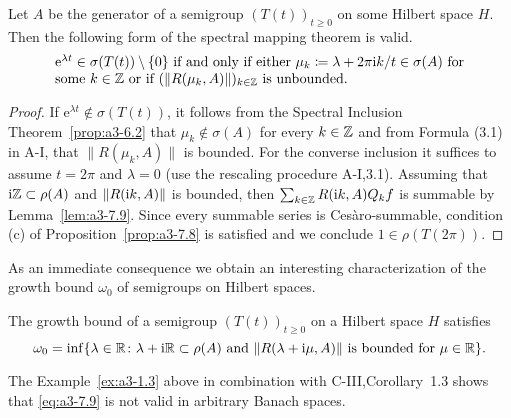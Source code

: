 \begin{theorem}\label{thm:a3-7.10}
%
Let $A$ be the generator of a semigroup $(T(t))_{t\geq 0}$ on some Hilbert space $H$.
Then the following form of the spectral mapping theorem is valid.
\[
\begin{minipage}{.85\textwidth}
	$ \mathrm{e}^{\lambda t} \in \sigma(T(t))\setminus\{0\} $ if and only if either 
	$\mu_{k}\coloneqq \lambda + 2\pi\im  k/t \in \sigma(A)$ for some  $k \in \Z$
	or  if $(\|R(\mu_{k},A)\|)_{k\in\Z}$ is unbounded.
\end{minipage}
\]
\end{theorem}
\begin{proof}
If $\mathrm{e}^{\lambda t} \not\in \sigma(T(t))$, it follows from the Spectral Inclusion Theorem~\ref{prop:a3-6.2} that $\mu_{k} \not\in \sigma(A)$ for every $k \in \mathbb{Z}$ and from Formula (3.1) in A-I, that $\|R(\mu_{k},A)\|$ is bounded.
For the converse inclusion it suffices to assume $t = 2\pi$ and $\lambda = 0$ (use the rescaling procedure A-I,3.1).
Assuming that $\mathrm{i}\mathbb{Z} \subset \rho(A)$ and $\|R(\mathrm{i} k,A)\|$ is bounded, then $\sum_{k\in\mathbb{Z}} R(\mathrm{i} k,A)Q_{k}f$ is summable by Lemma~\ref{lem:a3-7.9}.
Since every summable series is Cesàro-summable, condition (c) of Proposition~\ref{prop:a3-7.8} is satisfied and we conclude $1 \in \rho(T(2\pi))$.
\end{proof}
As an immediate consequence we obtain an interesting characterization of the growth bound $\omega_{0}$ of semigroups on Hilbert spaces.
\begin{corollary}\label{cor:a3-7.11}
%
The growth bound of a semigroup $(T(t))_{t\geq 0}$ on a Hilbert space $H$ satisfies
\begin{equation}\label{eq:a3-7.9}
\omega_{0} = \inf \{\lambda \in \mathbb{R} \colon \lambda + \mathrm{i}\mathbb{R} \subset \rho(A) \text{ and } \|R(\lambda+\mathrm{i}\mu,A)\| \text{ is bounded for } \mu \in \mathbb{R}\} .
\end{equation}
\end{corollary}
The Example~\ref{ex:a3-1.3} above in combination with C-III,Corollary~1.3 shows that \eqref{eq:a3-7.9} is not valid in arbitrary Banach spaces.
